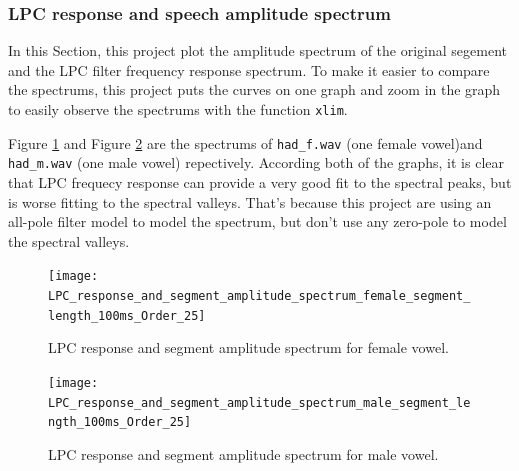 \documentclass{article}
\begin{document}
\subsubsection{LPC response and speech amplitude spectrum}

In this Section, this project plot the amplitude spectrum of the original segement and the LPC filter frequency response spectrum. To make it easier to compare the spectrums, this project puts the curves on one graph and zoom in the graph to easily observe the spectrums with the function \verb+xlim+. 

Figure \ref{fig:response-spectrum-female} and Figure \ref{fig:response-spectrum-male} are the spectrums of \verb+had_f.wav+ (one female vowel)and \verb+had_m.wav+ (one male vowel) repectively. According both of the graphs, it is clear that LPC frequecy response can provide a very good fit to the spectral peaks, but is worse fitting to the spectral valleys. That's because this project are using an all-pole filter model to model the spectrum, but don't use any zero-pole to model the spectral valleys\citep{EEEM030}. 

\begin{figure}[ht]
\begin{center}
\texttt{[image: LPC\_response\_and\_segment\_amplitude\_spectrum\_female\_segment\_length\_100ms\_Order\_25]}
\end{center}
\caption{\label{fig:response-spectrum-female} LPC response and segment amplitude spectrum for female vowel.}
\end{figure}

\begin{figure}[ht]
\begin{center}
\texttt{[image: LPC\_response\_and\_segment\_amplitude\_spectrum\_male\_segment\_length\_100ms\_Order\_25]}
\end{center}
\caption{\label{fig:response-spectrum-male} LPC response and segment amplitude spectrum for male vowel.}
\end{figure}

\end{document}
